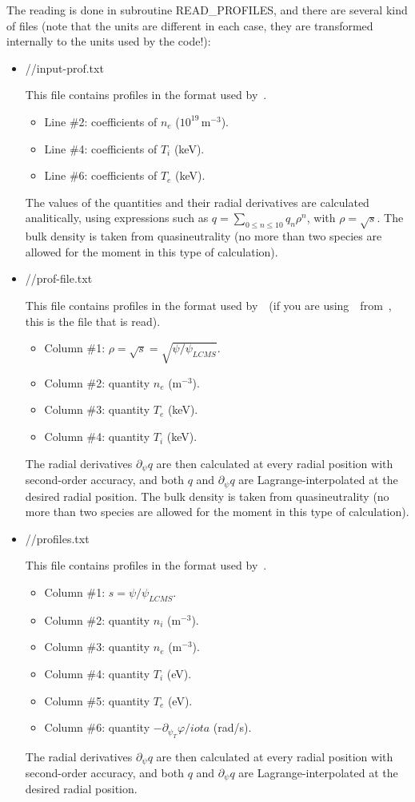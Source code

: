 The reading is done in subroutine {\ttfamily READ\_PROFILES}, and there are several kind of files (note that the units are different in each case, they are transformed internally to the units used by the code!): 
\begin{itemize}

  
\item {\ttfamily //input-prof.txt}

This file contains profiles in the format used by~\TASKTD.
\begin{itemize}
\item Line \#2: coefficients of $n_e$ ($10^{19}\,$m$^{-3}$).
\item Line \#4: coefficients of $T_i$ (keV).
\item Line \#6: coefficients of $T_e$ (keV).
\end{itemize}
The values of the quantities and their radial derivatives are calculated analitically, using expressions such as $q=\sum_{0\le n\le 10} q_n\rho^n$, with $
\rho=\sqrt{s}$. The bulk density is taken from quasineutrality (no more than two species are allowed for the moment in this type of calculation).


\item {\ttfamily //prof-file.txt}

This file contains profiles in the format used by~\TASKTD~(if you are using~\KNOSOS~from~\TASKTD, this is the file that is read).
\begin{itemize}
\item Column \#1: $\rho=\sqrt{s}=\sqrt{\psi/\psi_{LCMS}}$.
\item Column \#2: quantity $n_e$ (m$^{-3}$).
\item Column \#3: quantity $T_e$ (keV).
\item Column \#4: quantity $T_i$ (keV).
\end{itemize}
The radial derivatives $\partial_\psi q$ are then calculated at every  radial position with second-order accuracy, and both $q$ and $\partial_\psi q$ are Lagrange-interpolated at the desired radial position. The bulk density is taken from quasineutrality (no more than two species are allowed for the moment in this type of calculation).


\item {\ttfamily //profiles.txt}

This file contains profiles in the format used by~\NEOTWO.
\begin{itemize}
\item Column \#1: $s=\psi/\psi_{LCMS}$.
\item Column \#2: quantity $n_i$ (m$^{-3}$).
\item Column \#3: quantity $n_e$ (m$^{-3}$).
\item Column \#4: quantity $T_i$ (eV).
\item Column \#5: quantity $T_e$ (eV).
\item Column \#6: quantity $-\partial_{\psi_T}\varphi/iota$ (rad/s).
\end{itemize}
The radial derivatives $\partial_\psi q$ are then calculated at every  radial position with second-order accuracy, and both $q$ and $\partial_\psi q$ are Lagrange-interpolated at the desired radial position.



\end{itemize}
